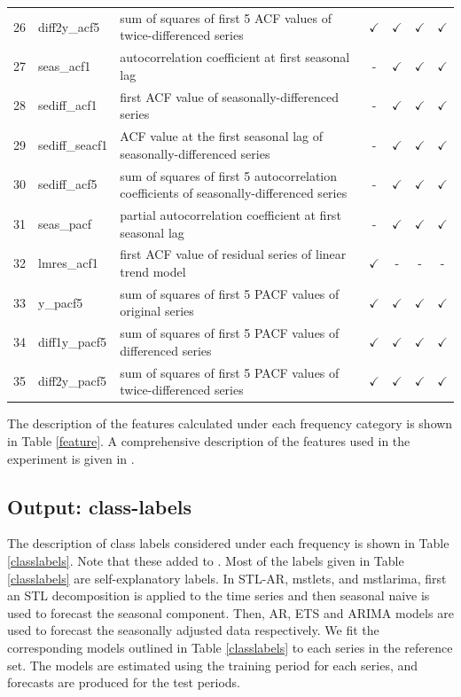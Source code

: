 \documentclass[11pt,a4paper,]{article}
\def\yes{$\checkmark$}
\begin{document}
\begin{table}[!htp]
\begin{tabular}{llp{}cccc}
26 & diff2y\_acf5   & sum of squares of first 5 ACF values of twice-differenced series                        & \yes  & \yes & \yes & \yes \\
27 & seas\_acf1     & autocorrelation coefficient at first seasonal lag                                       & -     & \yes & \yes & \yes\\
28 & sediff\_acf1   & first ACF value of seasonally-differenced series                                        & -     & \yes & \yes & \yes\\
29 & sediff\_seacf1 & ACF value at the first seasonal lag of seasonally-differenced series                    & -     & \yes & \yes & \yes\\
30 & sediff\_acf5   & sum of squares of first 5 autocorrelation coefficients of seasonally-differenced series & -     & \yes & \yes & \yes\\
31 & seas\_pacf     & partial autocorrelation coefficient at first seasonal lag & -     & \yes & \yes & \yes\\
32 & lmres\_acf1    & first ACF value of residual series of linear trend model                                & \yes  & - & - & -\\
33 & y\_pacf5       & sum of squares of first 5 PACF values of original series                                & \yes  & \yes & \yes & \yes\\
34 & diff1y\_pacf5  & sum of squares of first 5 PACF values of differenced series                             & \yes  & \yes & \yes & \yes\\
35 & diff2y\_pacf5  & sum of squares of first 5 PACF values of twice-differenced series                       & \yes  & \yes & \yes & \yes\\
\bottomrule
\end{tabular}
\end{table}

The description of the features calculated under each frequency category
is shown in Table \ref{feature}. A comprehensive description of the
features used in the experiment is given in \textcite{fforms}.

\subsection{Output: class-labels}\label{output-class-labels}

The description of class labels considered under each frequency is shown
in Table \ref{classlabels}. Note that these added to \textcite{fforms}.
Most of the labels given in Table \ref{classlabels} are self-explanatory
labels. In STL-AR, mstlets, and mstlarima, first an STL decomposition is
applied to the time series and then seasonal naive is used to forecast
the seasonal component. Then, AR, ETS and ARIMA models are used to
forecast the seasonally adjusted data respectively. We fit the
corresponding models outlined in Table \ref{classlabels} to each series
in the reference set. The models are estimated using the training period
for each series, and forecasts are produced for the test periods.
\end{document}
